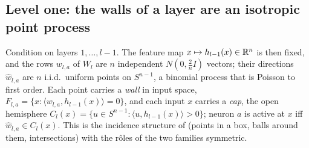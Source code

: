 \label{sec:levels}
\subsection{Level one: the walls of a layer are an isotropic point process}
Condition on layers $1,\dots,l-1$. The feature map $x\mapsto h_{l-1}(x)\in\mathbb R^n$ is then fixed, and the rows
$w_{l,a}$ of $W_l$ are $n$ independent $N(0,\tfrac2nI)$ vectors; their directions $\hat w_{l,a}$ are $n$ i.i.d.\
uniform points on $S^{n-1}$, a binomial process that is Poisson to first order. Each point carries a \emph{wall} in
input space, $F_{l,a}=\{x:\langle w_{l,a},h_{l-1}(x)\rangle=0\}$, and each input $x$ carries a \emph{cap}, the open
hemisphere $C_l(x)=\{u\in S^{n-1}:\langle u,h_{l-1}(x)\rangle>0\}$; neuron $a$ is active at $x$ iff
$\hat w_{l,a}\in C_l(x)$. This is the incidence structure of \cite[\S3.3]{survey} (points in a box, balls around
them, intersections) with the r\^oles of the two families symmetric.

